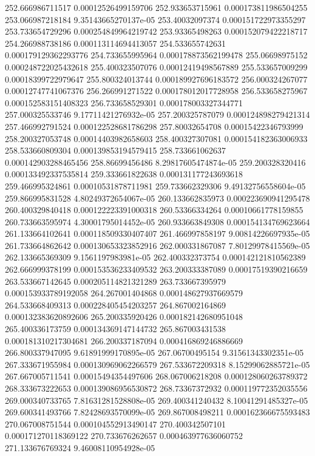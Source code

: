 {252.666986711517 0.00012526499159706
252.933653715961 0.000173811986504255
253.066987218184 9.35143665270137e-05
253.40032097374 0.000151722973355297
253.733654729296 0.000254849964219742
253.93365498263 0.000152079422218717
254.266988738186 0.000113114694413057
254.533655742631 0.000179129362293776
254.733655995964 0.000178873562199478
255.06698975152 0.000248722025432618
255.400323507076 0.00012419498567889
255.533657009299 0.00018399722979647
255.800324013744 0.000189927696183572
256.000324267077 0.00012747741067376
256.266991271522 0.000178012017728958
256.533658275967 0.000152583151408323
256.733658529301 0.000178003327344771
257.000325533746 9.17711421276932e-05
257.200325787079 0.000124898279421314
257.466992791524 0.000122528681786298
257.80032654708 0.00015422346793999
258.200327053748 0.00014403982658603
258.400327307081 0.000154182363006933
258.533660809304 0.000139853194579415
258.733661062637 0.000142903288465456
258.86699456486 8.29817605474874e-05
259.200328320416 0.000133492337535814
259.333661822638 0.000131177243693618
259.466995324861 0.00010531878711981
259.733662329306 9.49132756558604e-05
259.866995831528 4.80249372654067e-05
260.133662835973 0.000223690941295478
260.400329840418 0.000122223391000318
260.53366334264 0.00010661778159855
260.733663595974 4.30001795014452e-05
260.933663849308 0.000154134769623664
261.133664102641 0.000118509330407407
261.466997858197 9.00814226697935e-05
261.733664862642 0.000130653323852916
262.000331867087 7.80129978415569e-05
262.133665369309 9.1561197983981e-05
262.400332373754 0.000142121810562389
262.666999378199 0.000153536233409532
263.200333387089 0.00017519390216659
263.533667142645 0.000205114821321289
263.733667395979 0.000153933789192058
264.267001404868 0.000148627937669579
264.533668409313 0.000228405454203257
264.867002164869 0.000132383620892606
265.200335920426 0.000182142680951048
265.400336173759 0.000134369147144732
265.867003431538 0.000181310217304681
266.200337187094 0.000416869246886669
266.800337947095 9.61891999170895e-05
267.06700495154 9.31561343302351e-05
267.333671955984 0.000130969062266579
267.533672209318 8.15299062885721e-05
267.667005711541 0.00015494354497606
268.067006218208 0.000128060263789372
268.333673222653 0.000139086956530872
268.73367372932 0.000119772352035556
269.000340733765 7.81631281528808e-05
269.400341240432 8.10041291485327e-05
269.600341493766 7.82428693570099e-05
269.867008498211 0.000162366675593483
270.067008751544 0.000104552913490147
270.400342507101 0.000171270118369122
270.733676262657 0.000463977636060752
271.133676769324 9.46008110954928e-05
}
